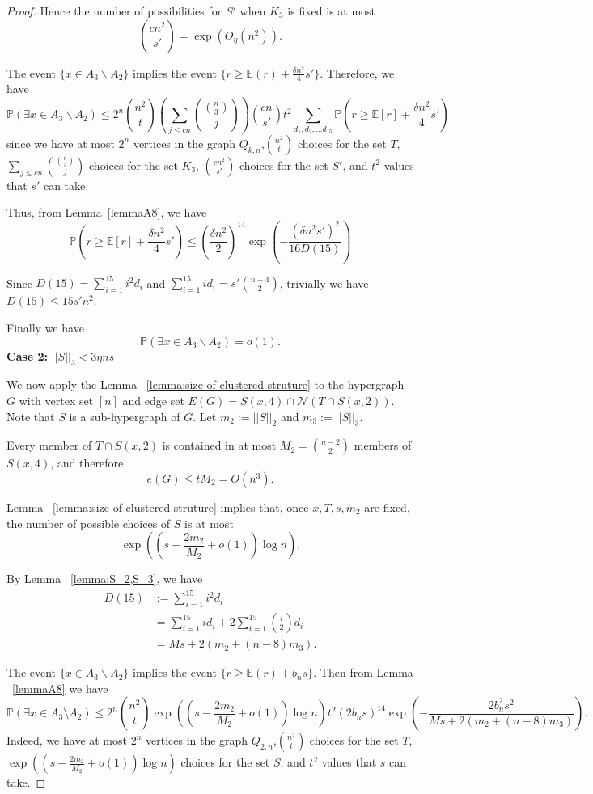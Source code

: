 \documentclass[reqno,11pt]{amsart}
\renewcommand{\leq}{\leqslant}
\renewcommand{\geq}{\geqslant}
\begin{document}
\begin{proof}
Hence the number of possibilities for \(S'\) when $K_3$ is fixed is at most
$$ \binom{cn^2}{s'} =\exp(O_\eta(n^2)) .
$$

The event $\{x \in A_3 \backslash A_2 \}$ implies the event $ \{r \geq \mathbb{E}(r)+\frac{\delta n^{2}}{4}s'\} $.
Therefore, we have 
$$ \mathbb{P}( \exists x \in A_3 \backslash A_2) \leq 2^n \binom{n^2}{t} \left(\sum_{j\leq  cn} \binom{\binom n3}{j} \right)\binom{cn}{s'}t^2\sum_{d_1,d_2,...d_{15}} \mathbb{P}\left(r \geq \mathbb{E}[r]+\frac{\delta n^2}{4}s' \right)$$
since we have at most $2^n$ vertices in the graph $Q_{k,n}$,$\binom{n^2}{t}$ choices for the set $T$, $\sum_{j\leq  cn}
\binom{\binom n3}{j}$ choices for the set $K_3$, $\binom{cn^2}{s'}$ choices for the set $S'$, and $t^2$ values that $s'$ can take.

Thus, from Lemma~\ref{lemmaA8}, we have 
$$\mathbb{P}\left (r \geq \mathbb{E}[r]+\frac{\delta n^2}{4}s' \right)\leq \left(\frac{\delta n^2}{2} \right)^{14} \exp \left(-\frac{(\delta n^2s')^2}{16D(15)} \right)$$

Since $D(15) =\sum_{i=1}^{15} i^2d_i$ and $\sum_{i=1}^{15}i d_i=s'\binom{n-4}{2}$, trivially  we have 
$D(15) \leq 15 s'n^2$.

Finally we have 
$$\mathbb{P}(\exists x \in A_3\backslash A_2)=o(1).$$ 
\medskip
\textbf{Case 2:} $||S||_3  <3\eta ns$

We now apply the Lemma ~\ref{lemma:size of clustered struture} to the hypergraph $G$ with vertex set $[n]$ and edge set $ E(G) = S(x,4)\cap \mathcal{N}(T\cap S(x,2))$. Note that $S$ is a sub-hypergraph of $G$.  Let $m_2:=||S||_2$ and $m_3:=||S||_3$. 

Every member of $T \cap S(x,2)$ is contained in at most $M_2=\binom{n-2}{2}$ members of \(S(x,4)\), and therefore
$$
e(G)\leq tM_2=O(n^3).
$$


Lemma ~\ref{lemma:size of clustered struture} implies that, once \(x,T,s,m_2\) are fixed, the number of possible choices of \(S\) is at most $$
\exp\left( \left(s-\frac{2m_2}{M_2}+o(1) \right)\log n \right).$$



By Lemma ~\ref{lemma:S_2,S_3}, we have 
\begin{align*}
D(15)
&:=\sum_{i=1}^{15}i^2d_i\\
&=
\sum_{i=1}^{15}i d_i
+
2\sum_{i=1}^{15}\binom{i}{2}d_i\\
&= Ms+2(m_2+(n-8)m_3).
\end{align*}

The event $\{x \in A_3 \backslash A_2 \}$ implies the event $ \{r \geq \mathbb{E}(r)+b_n s\} $. Then from Lemma ~\ref{lemmaA8} we have 
$$\mathbb{P}(\exists x \in A_3\setminus A_2)\leq 2^n \binom{n^2}{t}\exp\left( \left(s-\frac{2m_2}{M_2}+o(1) \right)\log n \right)t^2(2b_ns)^{14}
\exp\left(
-\frac{2b_n^2s^2}
{Ms+2(m_2+(n-8)m_3)}\right).
$$
Indeed, we have at most $2^n$ vertices in the graph $Q_{2,n}$,$\binom{n^2}{t}$ choices for the set $T$, $\exp\left( \left(s-\frac{2m_2}{M_2}+o(1) \right)\log n \right)$ choices for the set $S$, and $t^2$ values that $s$ can take.


\end{proof}
\end{document}
